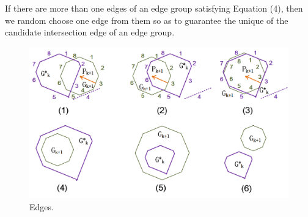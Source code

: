 If there are more than one edges of an edge group satisfying Equation (4), then we random choose one edge from them so as to guarantee the unique of the candidate intersection edge of an edge group.

\begin{example}

\end{example}



\begin{figure}[tb!]
\centering
\includegraphics[scale=0.88]{figures/Fig-poly-edges.png}
\vspace{-1ex}
\caption{\small Edges.}
\vspace{-2ex}
\label{fig:poly-edges}
\end{figure}



